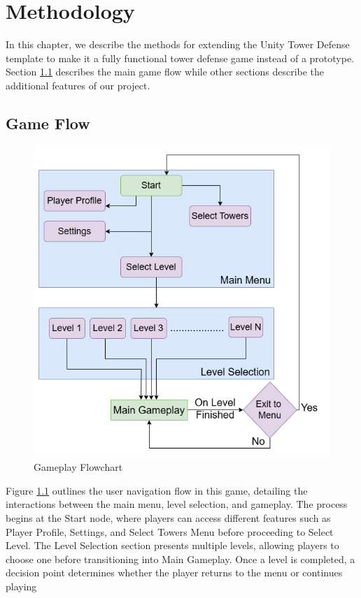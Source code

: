 \documentclass[12pt,a4paper]{report}
\begin{document}
\chapter{Methodology}
In this chapter, we describe the methods for extending the Unity Tower Defense template to make it a fully functional tower defense game instead of a prototype. Section \ref{sec:GameFlow} describes the main game flow while other sections describe the additional features of our project.

\section{Game Flow}
\label{sec:GameFlow}
\begin{figure}[h!]
	\centering
	\includegraphics[scale=0.55]{images/GDLabProjFlowChart.png}
	\caption{Gameplay Flowchart}
	\label{fig:GameplayFlowchart}
\end{figure}

Figure \ref{fig:GameplayFlowchart} outlines the user navigation flow in this game, detailing the interactions between the main menu, level selection, and gameplay. The process begins at the Start node, where players can access different features such as Player Profile, Settings, and Select Towers Menu before proceeding to Select Level. The Level Selection section presents multiple levels, allowing players to choose one before transitioning into Main Gameplay. Once a level is completed, a decision point determines whether the player returns to the menu or continues playing
\end{document}
